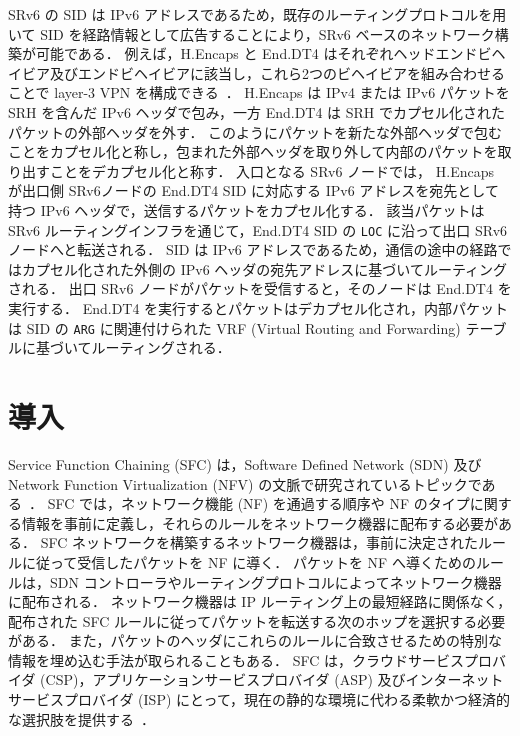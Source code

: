 SRv6 の SID は IPv6 アドレスであるため，既存のルーティングプロトコルを用いて SID を経路情報として広告することにより，SRv6 ベースのネットワーク構築が可能である．
例えば，H.Encaps と End.DT4 はそれぞれヘッドエンドビヘイビア及びエンドビヘイビアに該当し，これら2つのビヘイビアを組み合わせることで layer-3 VPN を構成できる~\cite{rfc9252}．
H.Encaps は IPv4 または IPv6 パケットを SRH を含んだ IPv6 ヘッダで包み，一方 End.DT4 は SRH でカプセル化されたパケットの外部ヘッダを外す．
このようにパケットを新たな外部ヘッダで包むことをカプセル化と称し，包まれた外部ヘッダを取り外して内部のパケットを取り出すことをデカプセル化と称す．
入口となる SRv6 ノードでは， H.Encaps が出口側 SRv6ノードの End.DT4 SID に対応する IPv6 アドレスを宛先として持つ IPv6 ヘッダで，送信するパケットをカプセル化する．
該当パケットは SRv6 ルーティングインフラを通じて，End.DT4 SID の \texttt{LOC} に沿って出口 SRv6 ノードへと転送される．
SID は IPv6 アドレスであるため，通信の途中の経路ではカプセル化された外側の IPv6 ヘッダの宛先アドレスに基づいてルーティングされる．
出口 SRv6 ノードがパケットを受信すると，そのノードは End.DT4 を実行する．
End.DT4 を実行するとパケットはデカプセル化され，内部パケットは SID の \texttt{ARG} に関連付けられた VRF (Virtual Routing and Forwarding) テーブルに基づいてルーティングされる．
\section{導入}
\label{section:background}
Service Function Chaining (SFC) は，Software Defined Network (SDN) 及び Network Function Virtualization (NFV) の文脈で研究されているトピックである~\cite{nfv,sfc-on-sdn-nfv-servey,sfc-on-sdn-scenario,imple-sfc-with-openflow}．
SFC では，ネットワーク機能 (NF) を通過する順序や NF のタイプに関する情報を事前に定義し，それらのルールをネットワーク機器に配布する必要がある．
SFC ネットワークを構築するネットワーク機器は，事前に決定されたルールに従って受信したパケットを NF に導く．
パケットを NF へ導くためのルールは，SDN コントローラやルーティングプロトコルによってネットワーク機器に配布される．
ネットワーク機器は IP ルーティング上の最短経路に関係なく，配布された SFC ルールに従ってパケットを転送する次のホップを選択する必要がある．
また，パケットのヘッダにこれらのルールに合致させるための特別な情報を埋め込む手法が取られることもある．
SFC は，クラウドサービスプロバイダ (CSP)，アプリケーションサービスプロバイダ (ASP) 及びインターネットサービスプロバイダ (ISP) にとって，現在の静的な環境に代わる柔軟かつ経済的な選択肢を提供する~\cite{survey-on-sfc}．

